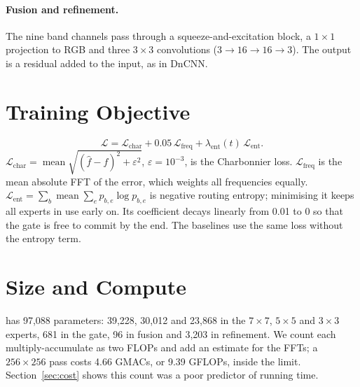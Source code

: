 \paragraph{Fusion and refinement.} The nine band channels pass through a
squeeze-and-excitation block, a $1\times1$ projection to RGB
and three $3\times3$ convolutions ($3\to16\to16\to3$). The output is a
residual added to the input, as in DnCNN.

\section{Training Objective}\label{sec:loss}

\begin{equation}
	\mathcal{L}=\mathcal{L}_\text{char}+0.05\,\mathcal{L}_\text{freq}+\lambda_\text{ent}(t)\,\mathcal{L}_\text{ent}.
\end{equation}
$\mathcal{L}_\text{char}=\operatorname{mean}\sqrt{(\hat f-f)^2+\varepsilon^2}$,
$\varepsilon=10^{-3}$, is the Charbonnier loss.
$\mathcal{L}_\text{freq}$ is the mean absolute FFT of the error, which weights
all frequencies equally. $\mathcal{L}_\text{ent}=\sum_b\operatorname{mean}
\sum_e p_{b,e}\log p_{b,e}$ is negative routing entropy; minimising it keeps
all experts in use early on. Its coefficient decays linearly from 0.01 to 0
so that the gate is free to commit by the end. The baselines use the same
loss without the entropy term.

\section{Size and Compute}\label{sec:size}

\fcsg{} has 97,088 parameters: 39,228, 30,012 and 23,868 in the $7\times7$,
$5\times5$ and $3\times3$ experts, 681 in the gate, 96 in fusion and 3,203 in
refinement. We count each multiply-accumulate as two FLOPs and add an
estimate for the FFTs; a $256\times256$ pass costs 4.66 GMACs, or 9.39
GFLOPs, inside the limit. Section~\ref{sec:cost} shows this count was a poor
predictor of running time.
